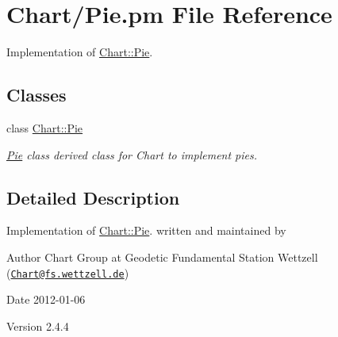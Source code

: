 \hypertarget{Pie_8pm}{
\section{Chart/Pie.pm File Reference}
\label{Pie_8pm}
}


Implementation of \hyperlink{classChart_1_1Pie}{Chart::Pie}.  


\subsection*{Classes}
\begin{DoxyCompactItemize}
\item 
class \hyperlink{classChart_1_1Pie}{Chart::Pie}
\begin{DoxyCompactList}\small\item\em \hyperlink{classChart_1_1Pie}{Pie} class derived class for Chart to implement pies. \item\end{DoxyCompactList}\end{DoxyCompactItemize}


\subsection{Detailed Description}
Implementation of \hyperlink{classChart_1_1Pie}{Chart::Pie}. written and maintained by \begin{DoxyAuthor}{Author}
Chart Group at Geodetic Fundamental Station Wettzell (\href{mailto:Chart@fs.wettzell.de}{\tt Chart@fs.wettzell.de}) 
\end{DoxyAuthor}
\begin{DoxyDate}{Date}
2012-\/01-\/06 
\end{DoxyDate}
\begin{DoxyVersion}{Version}
2.4.4 
\end{DoxyVersion}
